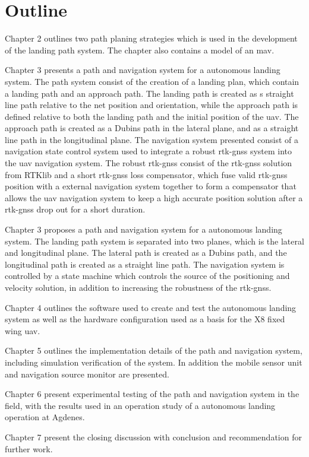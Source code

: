 \section{Outline}
Chapter 2 outlines two path planing strategies which is used in the development of the landing path system. The chapter also contains a model of an \gls{mav}.

Chapter 3 presents a path and navigation system for a autonomous landing system. The path system consist of the creation of a landing plan, which contain a landing path and an approach path. The landing path is created as s straight line path relative to the net position and orientation, while the approach path is defined relative to both the landing path and the initial position of the \gls{uav}. The approach path is created as a Dubins path in the lateral plane, and as a straight line path in the longitudinal plane. The navigation system presented consist of a navigation state control system used to integrate a robust \gls{rtk-gnss} system into the \gls{uav} navigation system. The robust \gls{rtk-gnss} consist of the \gls{rtk-gnss} solution from RTKlib and a short \gls{rtk-gnss} loss compensator, which fuse valid \gls{rtk-gnss} position with a external navigation system together to form a compensator that allows the \gls{uav} navigation system to keep a high accurate position solution after a \gls{rtk-gnss} drop out for a short duration.

Chapter 3 proposes a path and navigation system for a autonomous landing system. The landing path system is separated into two planes, which is the lateral and longitudinal plane. The lateral path is created as a Dubins path, and the longitudinal path is created as a straight line path. The navigation system is controlled by a state machine which controls the source of the positioning and velocity solution, in addition to increasing the robustness of the \gls{rtk-gnss}.

Chapter 4 outlines the software used to create and test the autonomous landing system as well as the hardware configuration used as a basis for the X8 fixed wing \gls{uav}.

Chapter 5 outlines the implementation details of the path and navigation system, including simulation verification of the system. In addition the mobile sensor unit and navigation source monitor are presented.

Chapter 6 present experimental testing of the path and navigation system in the field, with the results used in an operation study of a autonomous landing operation at Agdenes.

Chapter 7 present the closing discussion with conclusion and recommendation for further work.
\cleardoublepage